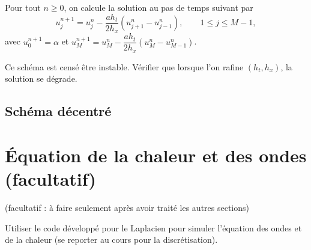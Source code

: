 \documentclass[12pt]{article}
\begin{document}
Pour tout $n \geq 0$, on calcule la solution au pas de temps suivant par
\begin{equation}
  \label{eq:transport_centre}
  u_j^{n+1} = u_j^n - \dfrac{a h_t}{2 h_x} (u_{j+1}^n - u_{j-1}^n) , \qquad 1 \leq j \leq M-1 ,
\end{equation}
avec $u_0^{n+1} = \alpha$ et $u_M^{n+1} = u_M^n - \dfrac{a h_t}{2 h_x} (u_{M}^n - u_{M-1}^n)$.

Ce sch\'ema est cens\'e \^etre instable.
V\'erifier que lorsque l'on rafine $(h_t,h_x)$, la solution se d\'egrade.

\subsection{Sch\'ema d\'ecentr\'e}

\section{\'Equation de la chaleur et des ondes (facultatif)}
(facultatif : \`a faire seulement apr\`es avoir trait\'e les autres sections)

Utiliser le code d\'evelopp\'e pour le Laplacien pour simuler l'\'equation des ondes
et de la chaleur (se reporter au cours pour la discr\'etisation).
\end{document}
